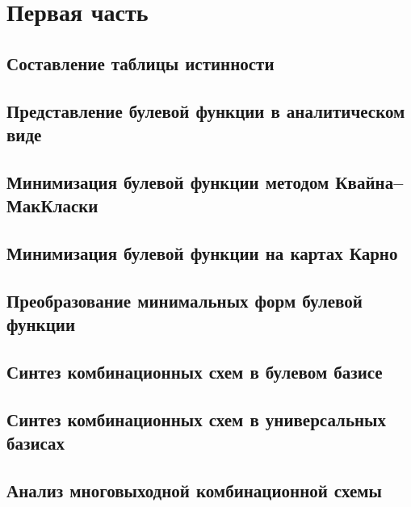 \documentclass[a4paper, 11pt]{article}
\begin{document}


\tableofcontents
\vspace{2em}
\pagebreak{}

\section{Первая часть}

\subsection{Составление таблицы истинности}

\subsection{Представление булевой функции в аналитическом виде}

\subsection{Минимизация булевой функции методом Квайна–МакКласки}

\subsection{Минимизация булевой функции на картах Карно}

\subsection{Преобразование минимальных форм булевой функции}

\subsection{Синтез комбинационных схем в булевом базисе}

\subsection{Синтез комбинационных схем в универсальных базисах}

\subsection{Анализ многовыходной комбинационной схемы}

\pagebreak
\end{document}
